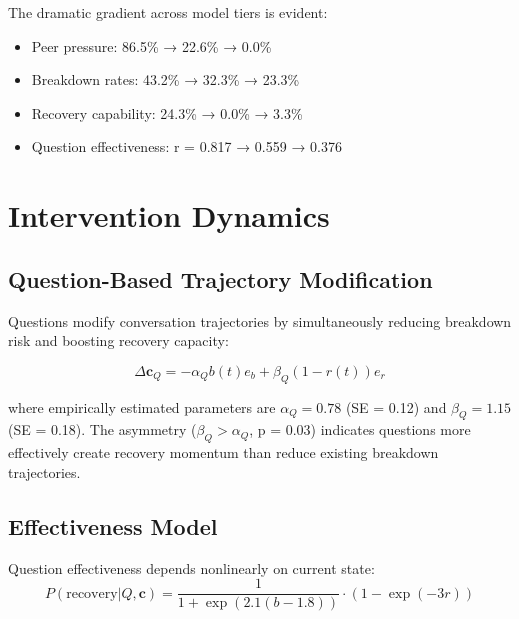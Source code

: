 \documentclass[11pt,letterpaper]{article}
\newcommand{\fullReasoningPeerPressure}{86.5\%}
\newcommand{\lightReasoningPeerPressure}{22.6\%}
\newcommand{\nonReasoningPeerPressure}{0.0\%}
\newcommand{\fullReasoningBreakdown}{43.2\%}
\newcommand{\lightReasoningBreakdown}{32.3\%}
\newcommand{\nonReasoningBreakdown}{23.3\%}
\newcommand{\fullReasoningRecovery}{24.3\%}
\newcommand{\lightReasoningRecovery}{0.0\%}
\newcommand{\nonReasoningRecovery}{3.3\%}
\newcommand{\fullQuestionCorrelation}{0.817}
\newcommand{\lightQuestionCorrelation}{0.559}
\newcommand{\nonQuestionCorrelation}{0.376}
\newcommand{\alphaQ}{0.78}
\newcommand{\alphaQSE}{0.12}
\newcommand{\betaQ}{1.15}
\newcommand{\betaQSE}{0.18}
\newcommand{\asymmetryP}{0.03}
\newcommand{\effectivenessExpCoeff}{2.1}
\newcommand{\effectivenessThreshold}{1.8}
\newcommand{\recoveryExpCoeff}{3}
\begin{document}
The dramatic gradient across model tiers is evident:
\begin{itemize}
    \item Peer pressure: \fullReasoningPeerPressure{} → \lightReasoningPeerPressure{} → \nonReasoningPeerPressure{}
    \item Breakdown rates: \fullReasoningBreakdown{} → \lightReasoningBreakdown{} → \nonReasoningBreakdown{}
    \item Recovery capability: \fullReasoningRecovery{} → \lightReasoningRecovery{} → \nonReasoningRecovery{}
    \item Question effectiveness: r = \fullQuestionCorrelation{} → \lightQuestionCorrelation{} → \nonQuestionCorrelation{}
\end{itemize}

\section{Intervention Dynamics}

\subsection{Question-Based Trajectory Modification}

Questions modify conversation trajectories by simultaneously reducing breakdown risk and boosting recovery capacity:

\begin{equation}
\Delta \mathbf{c}_Q = -\alpha_Q b(t) e_b + \beta_Q (1-r(t)) e_r
\end{equation}

where empirically estimated parameters are $\alpha_Q = \alphaQ{}$ (SE = \alphaQSE{}) and $\beta_Q = \betaQ{}$ (SE = \betaQSE{}). The asymmetry ($\beta_Q > \alpha_Q$, p = \asymmetryP{}) indicates questions more effectively create recovery momentum than reduce existing breakdown trajectories.

\subsection{Effectiveness Model}

Question effectiveness depends nonlinearly on current state:
\begin{equation}
P(\text{recovery}|Q, \mathbf{c}) = \frac{1}{1 + \exp(\effectivenessExpCoeff{}(b - \effectivenessThreshold{}))} \cdot (1 - \exp(-\recoveryExpCoeff{}r))
\end{equation}
\end{document}
